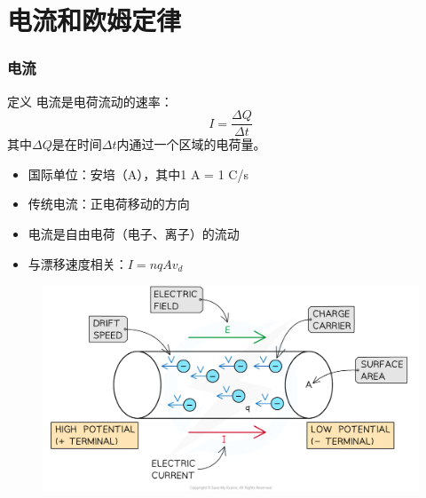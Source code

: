 \documentclass{beamer}
\begin{document}
\section{电流和欧姆定律}
\begin{frame}
    \frametitle{电流}
    \begin{block}{定义}
        电流是电荷流动的速率：
        \[ I = \frac{\Delta Q}{\Delta t} \]
        其中$\Delta Q$是在时间$\Delta t$内通过一个区域的电荷量。
    \end{block}
    \begin{itemize}
        \item 国际单位：安培（A），其中1 A = 1 C/s
        \item 传统电流：正电荷移动的方向
        \item 电流是自由电荷（电子、离子）的流动
        \item 与漂移速度相关：$I = nqAv_d$
    \end{itemize}
\end{frame}
\begin{frame}{}
    \begin{figure}
        \centering
        \includegraphics[width=1\linewidth]{5-1-2-charge-carriers-drifting-along-the-conductor_sl-physics-rn-3.png}
    \end{figure}
\end{frame}
\end{document}
